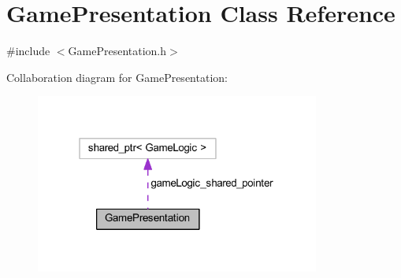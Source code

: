 \hypertarget{class_game_presentation}{}\section{Game\+Presentation Class Reference}
\label{class_game_presentation}


{\ttfamily \#include $<$Game\+Presentation.\+h$>$}



Collaboration diagram for Game\+Presentation\+:\nopagebreak
\begin{figure}[H]
\begin{center}
\leavevmode
\includegraphics[width=265pt]{class_game_presentation__coll__graph}
\end{center}
\end{figure}
